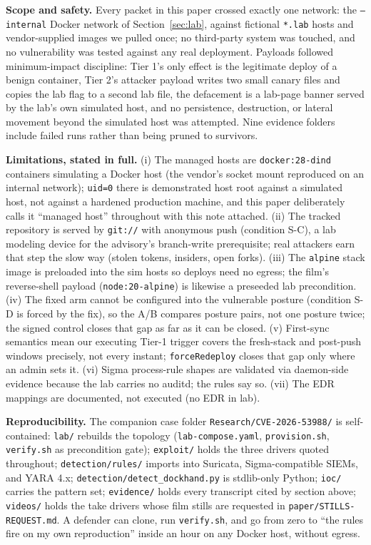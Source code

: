 \documentclass[journal]{IEEEtran}
\begin{document}
\textbf{Scope and safety.} Every packet in this paper crossed exactly one
network: the \texttt{--internal} Docker network of Section~\ref{sec:lab},
against fictional \texttt{*.lab} hosts and vendor-supplied images we pulled
once; no third-party system was touched, and no vulnerability was tested
against any real deployment. Payloads followed minimum-impact discipline:
Tier 1's only effect is the legitimate deploy of a benign container, Tier 2's
attacker payload writes two small canary files and copies the lab flag to a
second lab file, the defacement is a lab-page banner served by the lab's own
simulated host, and no persistence, destruction, or lateral movement beyond
the simulated host was attempted. Nine evidence folders include failed runs
rather than being pruned to survivors.

\textbf{Limitations, stated in full.} (i) The managed hosts are
\texttt{docker:28-dind} containers simulating a Docker host (the vendor's
socket mount reproduced on an internal network); \texttt{uid=0} there is
demonstrated host root against a simulated host, not against a hardened
production machine, and this paper deliberately calls it ``managed host''
throughout with this note attached. (ii) The tracked repository is served by
\texttt{git://} with anonymous push (condition S-C), a lab modeling device for
the advisory's branch-write prerequisite; real attackers earn that step the
slow way (stolen tokens, insiders, open forks). (iii) The \texttt{alpine}
stack image is preloaded into the sim hosts so deploys need no egress; the
film's reverse-shell payload (\texttt{node:20-alpine}) is likewise a preseeded
lab precondition. (iv) The fixed arm cannot be configured into the vulnerable
posture (condition S-D is forced by the fix), so the A/B compares posture
pairs, not one posture twice; the signed control closes that gap as far as it
can be closed. (v) First-sync semantics mean our executing Tier-1 trigger
covers the fresh-stack and post-push windows precisely, not every instant;
\texttt{forceRedeploy} closes that gap only where an admin sets it.
(vi) Sigma process-rule shapes are validated via daemon-side evidence because
the lab carries no auditd; the rules say so. (vii) The EDR mappings are
documented, not executed (no EDR in lab).

\textbf{Reproducibility.} The companion case folder \texttt{Research/}\allowbreak\texttt{CVE-2026-53988/}
is self-contained: \texttt{lab/} rebuilds the topology (\texttt{lab-compose.yaml},
\texttt{provision.sh}, \texttt{verify.sh} as precondition gate);
\texttt{exploit/} holds the three drivers quoted throughout;
\texttt{detection/rules/} imports into Suricata, Sigma-compatible SIEMs, and YARA 4.x;
\texttt{detection/detect\_dockhand.py} is stdlib-only Python;
\texttt{ioc/} carries the pattern set; \texttt{evidence/} holds every
transcript cited by section above; \texttt{videos/} holds the take drivers
whose film stills are requested in \texttt{paper/}\allowbreak\texttt{STILLS-REQUEST.md}.
A defender can clone, run \texttt{verify.sh}, and go from zero to ``the rules
fire on my own reproduction'' inside an hour on any Docker host, without
egress.
\end{document}
